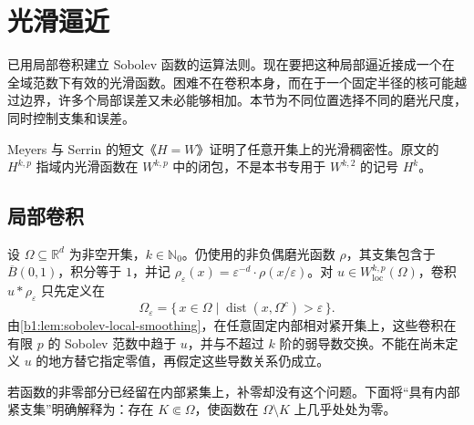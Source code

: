 \section{光滑逼近}
\label{b1:sec:2201}

已用局部卷积建立 Sobolev 函数的运算法则。现在要把这种局部逼近接成一个在全域范数下有效的光滑函数。困难不在卷积本身，而在于一个固定半径的核可能越过边界，许多个局部误差又未必能够相加。本节为不同位置选择不同的磨光尺度，同时控制支集和误差。

\ProseParagraphBreak

Meyers 与 Serrin 的短文《\(H=W\)》\cite[pp. 1055--1056]{MeyersSerrin1964HW}证明了任意开集上的光滑稠密性。原文的 \(H^{k,p}\) 指域内光滑函数在 \(W^{k,p}\) 中的闭包，不是本书专用于 \(W^{k,2}\) 的记号 \(H^k\)。


\subsection{局部卷积}
\label{b1:subsec:220101}

设 \(\Omega\subseteq\mathbb R^d\) 为非空开集，\(k\in\mathbb N_0\)。仍使用的非负偶磨光函数 \(\rho\)，其支集包含于 \(\overline B(0,1)\)，积分等于 \(1\)，并记 \(\rho_\varepsilon(x)=\varepsilon^{-d}\cdot \rho(x/\varepsilon)\)。对 \(u\in W^{k,p}_{\mathrm{loc}}(\Omega)\)，卷积 \(u*\rho_\varepsilon\) 只先定义在
\[
 \Omega_\varepsilon
 =\{\,x\in\Omega\mid\operatorname{dist}(x,\Omega^c)>\varepsilon\,\}.
\]
由\cref{b1:lem:sobolev-local-smoothing}，在任意固定内部相对紧开集上，这些卷积在有限 \(p\) 的 Sobolev 范数中趋于 \(u\)，并与不超过 \(k\) 阶的弱导数交换。不能在尚未定义 \(u\) 的地方替它指定零值，再假定这些导数关系仍成立。

\ProseParagraphBreak

若函数的非零部分已经留在内部紧集上，补零却没有这个问题。下面将“具有内部紧支集”明确解释为：存在 \(K\Subset\Omega\)，使函数在 \(\Omega\setminus K\) 上几乎处处为零。

